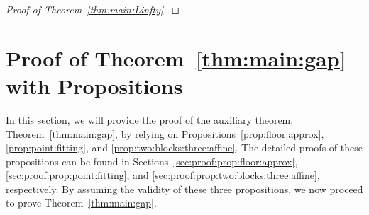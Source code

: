 \documentclass[nohyperref]{article}
\theoremstyle{plain}
\theoremstyle{definition}
\theoremstyle{remark}
\begin{document}
\begin{proof}[Proof of Theorem~\ref{thm:main:Linfty}]
\end{proof}



\section{Proof of Theorem~\ref{thm:main:gap}  with Propositions}
\label{sec:proof:thm:main:gap}

In this section, we will provide the proof of the auxiliary theorem, Theorem~\ref{thm:main:gap}, by relying on Propositions~\ref{prop:floor:approx}, \ref{prop:point:fitting}, and \ref{prop:two:blocks:three:affine}. The detailed proofs of these propositions can be found in Sections~\ref{sec:proof:prop:floor:approx}, \ref{sec:proof:prop:point:fitting}, and \ref{sec:proof:prop:two:blocks:three:affine}, respectively. By assuming the validity of these three propositions, we  now proceed to prove Theorem~\ref{thm:main:gap}.
\end{document}
